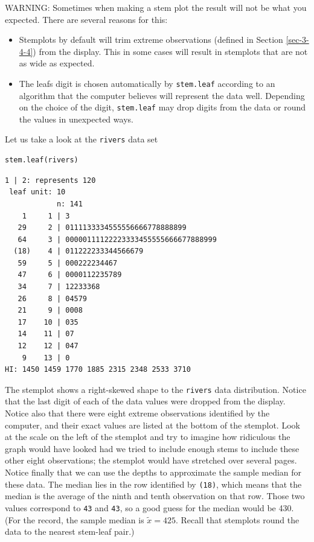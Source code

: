 \documentclass[captions=tableheading]{scrbook}
\begin{document}
WARNING: Sometimes when making a stem plot the result will not be what you expected. There are several reasons for this: 
\begin{itemize}
\item Stemplots by default will trim extreme observations (defined in Section \ref{sec-3-4-4}) from the display. This in some cases will result in stemplots that are not as wide as expected.
\item The leafs digit is chosen automatically by \texttt{stem.leaf} according to an algorithm that the computer believes will represent the data well. Depending on the choice of the digit, \texttt{stem.leaf} may drop digits from the data or round the values in unexpected ways.
\end{itemize}

Let us take a look at the \texttt{rivers} data set


\lstset{language=R}
\begin{lstlisting}
stem.leaf(rivers)
\end{lstlisting}


\begin{verbatim}
1 | 2: represents 120
 leaf unit: 10
            n: 141
    1     1 | 3
   29     2 | 0111133334555556666778888899
   64     3 | 00000111122223333455555666677888999
  (18)    4 | 011222233344566679
   59     5 | 000222234467
   47     6 | 0000112235789
   34     7 | 12233368
   26     8 | 04579
   21     9 | 0008
   17    10 | 035
   14    11 | 07
   12    12 | 047
    9    13 | 0
HI: 1450 1459 1770 1885 2315 2348 2533 3710
\end{verbatim}

The stemplot shows a right-skewed shape to the \texttt{rivers} data distribution. Notice that the last digit of each of the data values were dropped from the display. Notice also that there were eight extreme observations identified by the computer, and their exact values are listed at the bottom of the stemplot. Look at the scale on the left of the stemplot and try to imagine how ridiculous the graph would have looked had we tried to include enough stems to include these other eight observations; the stemplot would have stretched over several pages. Notice finally that we can use the depths to approximate the sample median for these data. The median lies in the row identified by \texttt{(18)}, which means that the median is the average of the ninth and tenth observation on that row. Those two values correspond to \texttt{43} and \texttt{43}, so a good guess for the median would be 430. (For the record, the sample median is \(\widetilde{x}=425\). Recall that stemplots round the data to the nearest stem-leaf pair.) 
\end{document}
